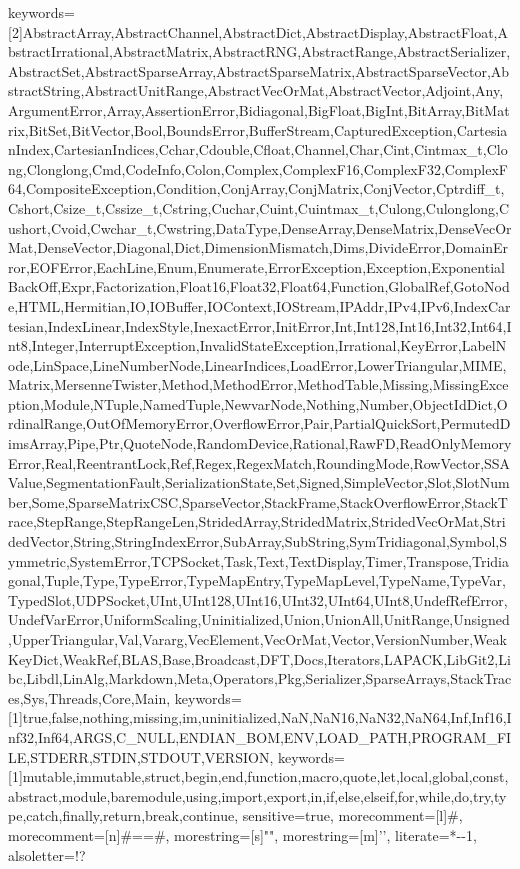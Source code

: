{	%
	keywords=[2]{AbstractArray,AbstractChannel,AbstractDict,AbstractDisplay,AbstractFloat,AbstractIrrational,AbstractMatrix,AbstractRNG,AbstractRange,AbstractSerializer,AbstractSet,AbstractSparseArray,AbstractSparseMatrix,AbstractSparseVector,AbstractString,AbstractUnitRange,AbstractVecOrMat,AbstractVector,Adjoint,Any,ArgumentError,Array,AssertionError,Bidiagonal,BigFloat,BigInt,BitArray,BitMatrix,BitSet,BitVector,Bool,BoundsError,BufferStream,CapturedException,CartesianIndex,CartesianIndices,Cchar,Cdouble,Cfloat,Channel,Char,Cint,Cintmax_t,Clong,Clonglong,Cmd,CodeInfo,Colon,Complex,ComplexF16,ComplexF32,ComplexF64,CompositeException,Condition,ConjArray,ConjMatrix,ConjVector,Cptrdiff_t,Cshort,Csize_t,Cssize_t,Cstring,Cuchar,Cuint,Cuintmax_t,Culong,Culonglong,Cushort,Cvoid,Cwchar_t,Cwstring,DataType,DenseArray,DenseMatrix,DenseVecOrMat,DenseVector,Diagonal,Dict,DimensionMismatch,Dims,DivideError,DomainError,EOFError,EachLine,Enum,Enumerate,ErrorException,Exception,ExponentialBackOff,Expr,Factorization,Float16,Float32,Float64,Function,GlobalRef,GotoNode,HTML,Hermitian,IO,IOBuffer,IOContext,IOStream,IPAddr,IPv4,IPv6,IndexCartesian,IndexLinear,IndexStyle,InexactError,InitError,Int,Int128,Int16,Int32,Int64,Int8,Integer,InterruptException,InvalidStateException,Irrational,KeyError,LabelNode,LinSpace,LineNumberNode,LinearIndices,LoadError,LowerTriangular,MIME,Matrix,MersenneTwister,Method,MethodError,MethodTable,Missing,MissingException,Module,NTuple,NamedTuple,NewvarNode,Nothing,Number,ObjectIdDict,OrdinalRange,OutOfMemoryError,OverflowError,Pair,PartialQuickSort,PermutedDimsArray,Pipe,Ptr,QuoteNode,RandomDevice,Rational,RawFD,ReadOnlyMemoryError,Real,ReentrantLock,Ref,Regex,RegexMatch,RoundingMode,RowVector,SSAValue,SegmentationFault,SerializationState,Set,Signed,SimpleVector,Slot,SlotNumber,Some,SparseMatrixCSC,SparseVector,StackFrame,StackOverflowError,StackTrace,StepRange,StepRangeLen,StridedArray,StridedMatrix,StridedVecOrMat,StridedVector,String,StringIndexError,SubArray,SubString,SymTridiagonal,Symbol,Symmetric,SystemError,TCPSocket,Task,Text,TextDisplay,Timer,Transpose,Tridiagonal,Tuple,Type,TypeError,TypeMapEntry,TypeMapLevel,TypeName,TypeVar,TypedSlot,UDPSocket,UInt,UInt128,UInt16,UInt32,UInt64,UInt8,UndefRefError,UndefVarError,UniformScaling,Uninitialized,Union,UnionAll,UnitRange,Unsigned,UpperTriangular,Val,Vararg,VecElement,VecOrMat,Vector,VersionNumber,WeakKeyDict,WeakRef,BLAS,Base,Broadcast,DFT,Docs,Iterators,LAPACK,LibGit2,Libc,Libdl,LinAlg,Markdown,Meta,Operators,Pkg,Serializer,SparseArrays,StackTraces,Sys,Threads,Core,Main},%
	keywords=[1]{true,false,nothing,missing,im,uninitialized,NaN,NaN16,NaN32,NaN64,Inf,Inf16,Inf32,Inf64,ARGS,C_NULL,ENDIAN_BOM,ENV,LOAD_PATH,PROGRAM_FILE,STDERR,STDIN,STDOUT,VERSION},
	keywords=[1]{mutable,immutable,struct,begin,end,function,macro,quote,let,local,global,const,abstract,module,baremodule,using,import,export,in,if,else,elseif,for,while,do,try,type,catch,finally,return,break,continue},%
	sensitive=true,
	morecomment=[l]{\#},
	morecomment=[n]{\#=}{=\#},
	morestring=[s]{"}{"},
	morestring=[m]{'}{'},
	literate=*{-}{-}1,
	alsoletter=!?
}

